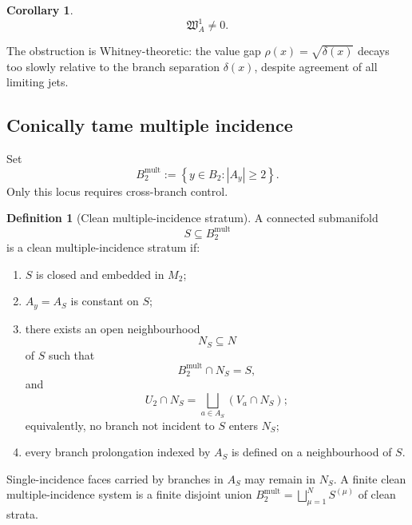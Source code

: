 \documentclass[11pt]{article}
\theoremstyle{plain}
\newtheorem{corollary}[theorem]{Corollary}
\theoremstyle{definition}
\newtheorem{definition}[theorem]{Definition}
\begin{document}
\begin{corollary}
\label{cor:exponential-residual-nonzero}
\[
  \mathfrak W_A^1\neq0.
\]
\end{corollary}

The obstruction is Whitney-theoretic: the value gap \(\rho(x)=\sqrt{\delta(x)}\) decays too slowly relative to the branch separation \(\delta(x)\), despite agreement of all limiting jets.

\subsection{Conically tame multiple incidence}
\label{subsec:conical-tameness}

Set
\[
  B_2^{\mathrm{mult}}
  :=
  \left\{
    y\in B_2:
    |A_y|\geq2
  \right\}.
\]
Only this locus requires cross-branch control.

\begin{definition}[Clean multiple-incidence stratum]
\label{def:clean-multiple-incidence}
A connected submanifold
\[
  S\subseteq B_2^{\mathrm{mult}}
\]
is a clean multiple-incidence stratum if:

\begin{enumerate}[label=\textup{(\roman*)}]
  \item \(S\) is closed and embedded in \(M_2\);

  \item \(A_y=A_S\) is constant on \(S\);

  \item there exists an open neighbourhood
        \[
          N_S\subseteq N
        \]
        of \(S\) such that
        \[
          B_2^{\mathrm{mult}}\cap N_S=S,
        \]
        and
        \[
          U_2\cap N_S
          =
          \bigsqcup_{a\in A_S}
          \left(
            V_a\cap N_S
          \right);
        \]
        equivalently, no branch not incident to \(S\) enters \(N_S\);

  \item every branch prolongation indexed by \(A_S\) is defined on a
        neighbourhood of \(S\).
\end{enumerate}
\end{definition}

Single-incidence faces carried by branches in \(A_S\) may remain in
\(N_S\). A finite clean
multiple-incidence system is a finite disjoint union \(B_2^{\mathrm{mult}} = \bigsqcup_{\mu=1}^N S^{(\mu)}\) of clean strata.
\end{document}
